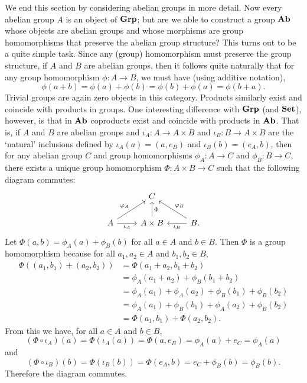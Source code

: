 We end this section by considering abelian groups in more detail. Now every
abelian group \(A\) is an object of \(\mathbf{Grp}\); but are we able to construct a
group \(\mathbf{Ab}\) whose objects are abelian groups and whose morphisms are group
homomorphisms that preserve the abelian group structure? This turns out to be a
quite simple task. Since any (group) homomorphism must preserve the group
structure, if \(A\) and \(B\) are abelian groups, then it follows quite
naturally that for any group homomorphism \(\phi: A \to B\), we must have (using
additive notation),
\[
    \phi(a+b) = \phi(a)+\phi(b) = \phi(b)+\phi(a) = \phi(b+a).
\]
Trivial groups are again zero objects in this category. Products similarly exist
and coincide with products in groups. One interesting difference with \(\mathbf{Grp}\)
(and \(\mathbf{Set}\)), however, is that in \(\mathbf{Ab}\) coproducts exist and coincide with
products in \(\mathbf{Ab}\). That is, if \(A\) and \(B\) are abelian groups and
\(\iota_A : A \to A \times B\) and \(\iota_B : B \to A \times B\) are the
`natural' inclusions defined by \(\iota_A(a) = (a, e_B)\) and \(\iota_B(b) =
(e_A, b)\), then for any abelian group \(C\) and group homomorphisms \(\phi_A: A
\to C\) and \(\phi_B: B \to C\), there exists a unique group homomorphism
\(\Phi: A \times B \to C\) such that the following diagram commutes:
\[
    \begin{tikzcd}
        & C & \\
        A \arrow[ur, "\phi_A"] \arrow[r, "\iota_A"'] & A \times B \arrow[u, "\Phi"'] & B \arrow[ul, "\phi_B"'] \arrow[l, "\iota_B"].
    \end{tikzcd}
\]
Let \(\Phi(a, b) = \phi_A(a) + \phi_B(b)\) for all \(a \in A\) and \(b \in B\).
Then \(\Phi\) is a group homomorphism because for all \(a_1, a_2 \in A\) and
\(b_1, b_2 \in B\),
\begin{align*}
    \Phi((a_1, b_1) + (a_2, b_2)) & = \Phi(a_1 + a_2, b_1 + b_2)\\
    & = \phi_A(a_1 + a_2) + \phi_B(b_1 + b_2)\\
    & = \phi_A(a_1) + \phi_A(a_2) + \phi_B(b_1) + \phi_B(b_2)\\
    & = \phi_A(a_1) + \phi_B(b_1) + \phi_A(a_2) + \phi_B(b_2)\\
    & = \Phi(a_1, b_1) + \Phi(a_2, b_2).
\end{align*}
From this we have, for all \(a \in A\) and \(b \in B\),
\[
    (\Phi \circ \iota_A)(a) = \Phi(\iota_A(a)) = \Phi(a, e_B) = \phi_A(a) + e_C = \phi_A(a)
\]
and
\[
    (\Phi \circ \iota_B)(b) = \Phi(\iota_B(b)) = \Phi(e_A, b) = e_C + \phi_B(b) = \phi_B(b).
\]
Therefore the diagram commutes.


